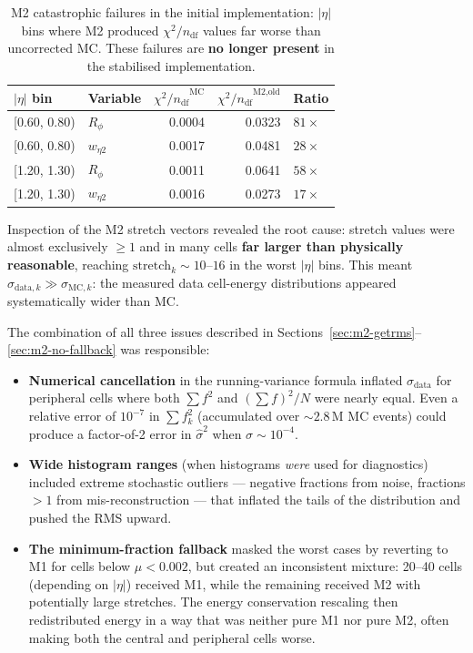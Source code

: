 \documentclass[11pt,a4paper]{article}
\newcommand{\abseta}{\ensuremath{|\eta|}}
\newcommand{\chisq}{\ensuremath{\chi^2 / n_{\mathrm{df}}}}
\begin{document}
\begin{table}[htbp]
\centering
\caption{M2 catastrophic failures in the initial implementation:
  $\abseta$ bins where M2 produced $\chisq$ values far worse than
  uncorrected MC.  These failures are \textbf{no longer present} in
  the stabilised implementation.}
\label{tab:m2-old-failures}
\begin{tabular}{llrrl}
\toprule
$\abseta$ bin & Variable
  & $\chisq^{\text{MC}}$ & $\chisq^{\text{M2,old}}$
  & Ratio \\
\midrule
{[}0.60, 0.80) & $R_\phi$ & 0.0004 & 0.0323 & $81\times$ \\
{[}0.60, 0.80) & $w_{\eta 2}$ & 0.0017 & 0.0481 & $28\times$ \\
{[}1.20, 1.30) & $R_\phi$ & 0.0011 & 0.0641 & $58\times$ \\
{[}1.20, 1.30) & $w_{\eta 2}$ & 0.0016 & 0.0273 & $17\times$ \\
\bottomrule
\end{tabular}
\end{table}

Inspection of the M2 stretch vectors revealed the root cause:
stretch values were almost exclusively $\geq 1$ and in many cells
\textbf{far larger than physically reasonable}, reaching
$\text{stretch}_k \sim 10$--$16$ in the worst $\abseta$ bins.  This
meant $\sigma_{\text{data},k} \gg \sigma_{\text{MC},k}$: the measured
data cell-energy distributions appeared systematically wider than MC.

The combination of all three issues described in
Sections~\ref{sec:m2-getrms}--\ref{sec:m2-no-fallback} was responsible:
\begin{itemize}
  \item \textbf{Numerical cancellation} in the running-variance formula
        inflated $\sigma_{\text{data}}$ for peripheral cells where both
        $\sum f^2$ and $(\sum f)^2 / N$ were nearly equal.  Even a
        relative error of $10^{-7}$ in $\sum f_k^2$ (accumulated over
        $\sim$$2.8\,\text{M}$ MC events) could produce a factor-of-2
        error in $\hat\sigma^2$ when $\sigma \sim 10^{-4}$.
  \item \textbf{Wide histogram ranges} (when histograms \emph{were} used
        for diagnostics) included extreme stochastic outliers ---
        negative fractions from noise, fractions $> 1$ from
        mis-reconstruction --- that inflated the tails of the
        distribution and pushed the RMS upward.
  \item \textbf{The minimum-fraction fallback} masked the worst cases by
        reverting to M1 for cells below $\mu < 0.002$, but created an
        inconsistent mixture: 20--40 cells (depending on $\abseta$)
        received M1, while the remaining received M2 with potentially
        large stretches.  The energy conservation rescaling then
        redistributed energy in a way that was neither pure M1 nor
        pure M2, often making both the central and peripheral cells
        worse.
\end{itemize}
\end{document}
